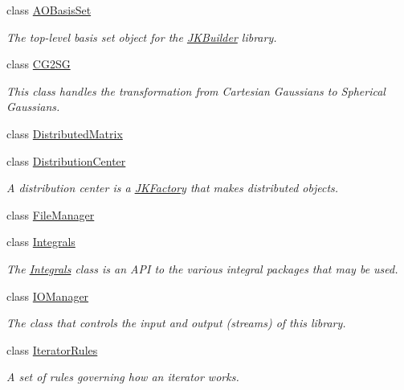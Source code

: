 \begin{DoxyCompactItemize}
class \hyperlink{classJKBuilder_1_1AOBasisSet}{AOBasisSet}
\begin{DoxyCompactList}\small\item\em The top-\/level basis set object for the \hyperlink{namespaceJKBuilder}{JKBuilder} library. \item\end{DoxyCompactList}\item 
class \hyperlink{classJKBuilder_1_1CG2SG}{CG2SG}
\begin{DoxyCompactList}\small\item\em This class handles the transformation from Cartesian Gaussians to Spherical Gaussians. \item\end{DoxyCompactList}\item 
class \hyperlink{classJKBuilder_1_1DistributedMatrix}{DistributedMatrix}
\item 
class \hyperlink{classJKBuilder_1_1DistributionCenter}{DistributionCenter}
\begin{DoxyCompactList}\small\item\em A distribution center is a \hyperlink{classJKBuilder_1_1JKFactory}{JKFactory} that makes distributed objects. \item\end{DoxyCompactList}\item 
class \hyperlink{classJKBuilder_1_1FileManager}{FileManager}
\item 
class \hyperlink{classJKBuilder_1_1Integrals}{Integrals}
\begin{DoxyCompactList}\small\item\em The \hyperlink{classJKBuilder_1_1Integrals}{Integrals} class is an API to the various integral packages that may be used. \item\end{DoxyCompactList}\item 
class \hyperlink{classJKBuilder_1_1IOManager}{IOManager}
\begin{DoxyCompactList}\small\item\em The class that controls the input and output (streams) of this library. \item\end{DoxyCompactList}\item 
class \hyperlink{classJKBuilder_1_1IteratorRules}{IteratorRules}
\begin{DoxyCompactList}\small\item\em A set of rules governing how an iterator works. \item\end{DoxyCompactList}\item 

\end{DoxyCompactItemize}
